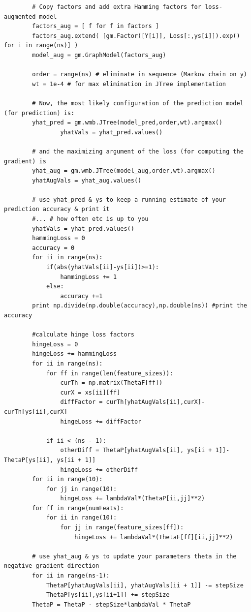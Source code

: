 \documentclass[twoside,11pt]{article}
\theoremstyle{definition}
\begin{document}
\begin{lstlisting}
        # Copy factors and add extra Hamming factors for loss-augmented model
        factors_aug = [ f for f in factors ]
        factors_aug.extend( [gm.Factor([Y[i]], Loss[:,ys[i]]).exp() for i in range(ns)] )
        model_aug = gm.GraphModel(factors_aug)

        order = range(ns) # eliminate in sequence (Markov chain on y)
        wt = 1e-4 # for max elimination in JTree implementation

        # Now, the most likely configuration of the prediction model (for prediction) is:
        yhat_pred = gm.wmb.JTree(model_pred,order,wt).argmax()
				yhatVals = yhat_pred.values()
				
        # and the maximizing argument of the loss (for computing the gradient) is
        yhat_aug = gm.wmb.JTree(model_aug,order,wt).argmax()
        yhatAugVals = yhat_aug.values()

        # use yhat_pred & ys to keep a running estimate of your prediction accuracy & print it
        #... # how often etc is up to you
        yhatVals = yhat_pred.values()
        hammingLoss = 0
        accuracy = 0
        for ii in range(ns):
            if(abs(yhatVals[ii]-ys[ii])>=1):
                hammingLoss += 1
            else:
                accuracy +=1
        print np.divide(np.double(accuracy),np.double(ns)) #print the accuracy

        #calculate hinge loss factors
        hingeLoss = 0
        hingeLoss += hammingLoss
        for ii in range(ns):
            for ff in range(len(feature_sizes)):
                curTh = np.matrix(ThetaF[ff])
                curX = xs[ii][ff]
                diffFactor = curTh[yhatAugVals[ii],curX]-curTh[ys[ii],curX]
                hingeLoss += diffFactor

            if ii < (ns - 1):
                otherDiff = ThetaP[yhatAugVals[ii], ys[ii + 1]]-ThetaP[ys[ii], ys[ii + 1]]
                hingeLoss += otherDiff
        for ii in range(10):
            for jj in range(10):
                hingeLoss += lambdaVal*(ThetaP[ii,jj]**2)
        for ff in range(numFeats):
            for ii in range(10):
                for jj in range(feature_sizes[ff]):
                    hingeLoss += lambdaVal*(ThetaF[ff][ii,jj]**2)
										
        # use yhat_aug & ys to update your parameters theta in the negative gradient direction
        for ii in range(ns-1):
            ThetaP[yhatAugVals[ii], yhatAugVals[ii + 1]] -= stepSize
            ThetaP[ys[ii],ys[ii+1]] += stepSize
        ThetaP = ThetaP - stepSize*lambdaVal * ThetaP


\end{lstlisting}
\end{document}
